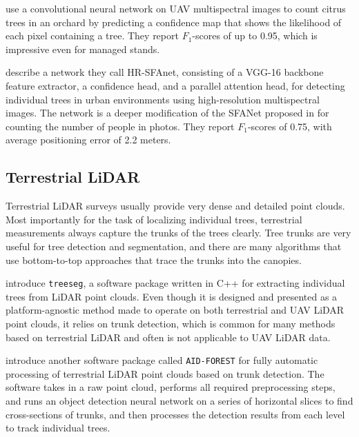 \citet{oscoConvolutionalNeuralNetwork2020} use a convolutional neural network on UAV multispectral images to count citrus trees in an orchard by predicting a confidence map that shows the likelihood of each pixel containing a tree.
They report $F_1$-scores of up to 0.95, which is impressive even for managed stands.

\citet{venturaIndividualTreeDetection2024} describe a network they call HR-SFAnet, consisting of a VGG-16 \citep{simonyanVeryDeepConvolutional2014} backbone feature extractor, a confidence head, and a parallel attention head, for detecting individual trees in urban environments using high-resolution multispectral images.
The network is a deeper modification of the SFANet proposed in \citet{zhuDualPathMultiScale2019} for counting the number of people in photos.
They report $F_1$-scores of 0.75, with average positioning error of 2.2 meters.

\subsection{Terrestrial LiDAR}

Terrestrial LiDAR surveys usually provide very dense and detailed point clouds.
Most importantly for the task of localizing individual trees, terrestrial measurements always capture the trunks of the trees clearly.
Tree trunks are very useful for tree detection and segmentation, and there are many algorithms that use bottom-to-top approaches that trace the trunks into the canopies.

\citet{burtExtractingIndividualTrees2018} introduce \texttt{treeseg}, a software package written in C++ for extracting individual trees from LiDAR point clouds.
Even though it is designed and presented as a platform-agnostic method made to operate on both terrestrial and UAV LiDAR point clouds, it relies on trunk detection, which is common for many methods based on terrestrial LiDAR and often is not applicable to UAV LiDAR data.

\citet{lopezserranoArtificialIntelligencebasedSoftware2022} introduce another software package called \texttt{AID-FOREST} for fully automatic processing of terrestrial LiDAR point clouds based on trunk detection.
The software takes in a raw point cloud, performs all required preprocessing steps, and runs an object detection neural network on a series of horizontal slices to find cross-sections of trunks, and then processes the detection results from each level to track individual trees.


